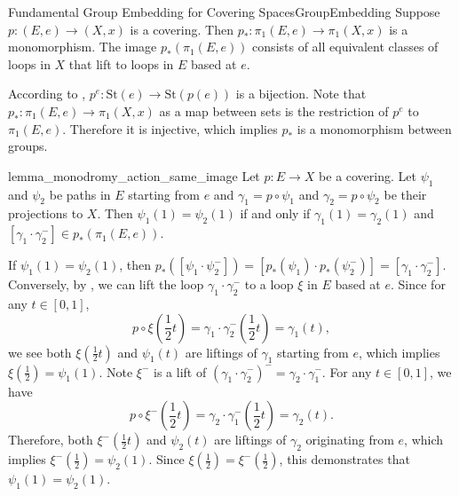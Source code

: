 \documentclass{report}
\begin{document}
\begin{corollary}{Fundamental Group Embedding for Covering Spaces}{GroupEmbedding}
	Suppose $p: (E,e) \to (X,x)$ is a covering. Then $p_*: \pi_1(E, e) \to \pi_1(X, x)$ is a monomorphism. The image $p_*(\pi_1(E, e))$ consists of all equivalent classes of loops in $X$ that lift to loops in $E$ based at $e$.
\end{corollary}

\begin{prf} 
	According to , $p^e:\mathrm{St}(e)\to\mathrm{St}(p(e))$ is a bijection. Note that $p_*: \pi_1(E, e) \to \pi_1(X, x)$ as a map between sets is the restriction of $p^e$ to $\pi_1(E, e)$. Therefore it is injective, which implies $p_*$ is a monomorphism between groups.
\end{prf}



\begin{lemma}{}{lemma_monodromy_action_same_image}
	Let $p:E\to X$ be a covering. Let $\psi_1$ and $\psi_2$ be paths in $E$ starting from $e$ and $\gamma_1=p\circ \psi_1$ and $\gamma_2=p\circ \psi_2$ be their projections to $X$. Then $\psi_1(1)=\psi_2(1)$ if and only if $\gamma_1(1)=\gamma_2(1)$ and $\left[\gamma_1 \cdot \gamma_2^{-}\right]\in p_* \left(\pi_1(E, e)\right)$.
\end{lemma}

\begin{prf}
	If $\psi_1(1)=\psi_2(1)$, then $p_*\left(\left[\psi_1 \cdot \psi_2^{-}\right]\right)=\left[p_*(\psi_1) \cdot p_*(\psi_2^{-})\right]=\left[\gamma_1 \cdot \gamma_2^{-}\right]$. Conversely, by , we can lift the loop $\gamma_1 \cdot \gamma_2^{-}$ to a loop $\xi$ in $E$ based at $e$. Since for any $t\in [0,1]$,
	\[
	p\circ\xi\left(\frac{1}{2}t\right)=\gamma_1 \cdot \gamma_2^{-}\left(\frac{1}{2}t\right)=\gamma_1(t),
	\]
	we see both $\xi\left(\frac{1}{2}t\right)$ and $\psi_1(t)$ are liftings of $\gamma_1$ starting from $e$, which implies $\xi(\frac{1}{2})=\psi_1(1)$. Note $\xi^{-}$ is a lift of $\left(\gamma_1 \cdot \gamma_2^{-}\right)^{-}=\gamma_2 \cdot \gamma_1^{-}$. For any $t\in [0,1]$, we have
	\[
    p\circ \xi^{-}\left(\frac{1}{2}t\right)=\gamma_2 \cdot \gamma_1^{-}\left(\frac{1}{2}t\right)=\gamma_2(t).
	\]
	Therefore, both $\xi^{-}\left(\frac{1}{2}t\right)$ and $\psi_2(t)$ are liftings of $\gamma_2$ originating from $e$, which implies $\xi^{-}\left(\frac{1}{2}\right)=\psi_2(1)$. Since $\xi\left(\frac{1}{2}\right)=\xi^{-}\left(\frac{1}{2}\right)$, this demonstrates that $\psi_1(1)=\psi_2(1)$.
\end{prf}
\end{document}
